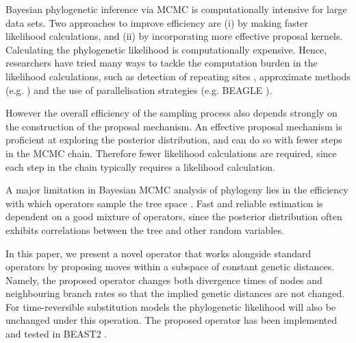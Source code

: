 \documentclass{bmcart}
\begin{document}
Bayesian phylogenetic inference via MCMC is computationally intensive for large data sets.
Two approaches to improve efficiency are (i) by making faster likelihood calculations, and (ii) by incorporating more effective proposal kernels. Calculating the phylogenetic likelihood is computationally expensive.
Hence, researchers have tried many ways to tackle the computation burden in the likelihood calculations, such as detection of repeating sites \cite{kobert2017efficient},  approximate methods (e.g. \cite{guindon2010bayesian,reis2011approximate}) and the use of parallelisation strategies (e.g. BEAGLE \cite{ayres2011beagle}).

However the overall efficiency of the sampling process also depends strongly on the construction of the proposal mechanism. An effective proposal mechanism is proficient at exploring the posterior distribution, and can do so with fewer steps in the MCMC chain. Therefore fewer likelihood calculations are required, since each step in the chain typically requires a likelihood calculation.

A major limitation in Bayesian MCMC analysis of phylogeny lies in the efficiency with which operators sample the tree space \cite{lakner2008efficiency,hohna2012guided}. Fast and reliable estimation is dependent on a good mixture of operators, since the posterior distribution often exhibits correlations between the tree and other random variables.

In this paper, we present a novel operator that works alongside standard operators by proposing moves within a subspace of constant genetic distances.
Namely, the proposed operator changes both divergence times of nodes and neighbouring branch rates so that the implied genetic distances are not changed. For time-reversible substitution models the phylogenetic likelihood will also be unchanged under this operation. The proposed operator has been implemented and tested in BEAST2 \cite{bouckaert2014beast}.
\end{document}
